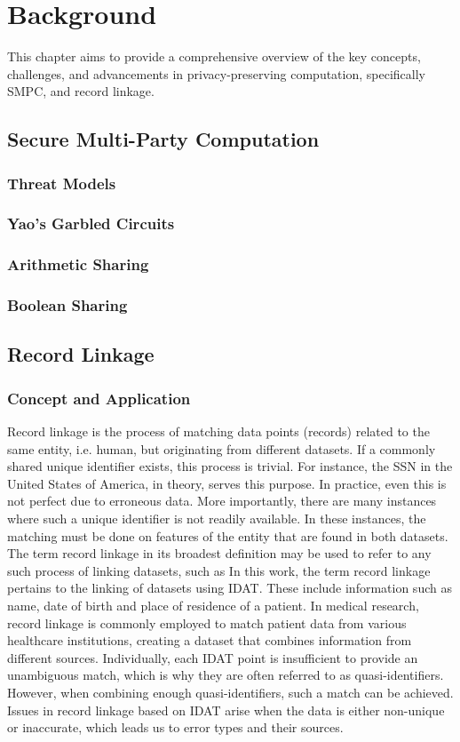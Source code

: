 \chapter{Background}\label{Background}
This chapter aims to provide a comprehensive overview of the key concepts, challenges, and advancements in privacy-preserving computation, specifically \ac{SMPC}, and record linkage.
\section{Secure Multi-Party Computation}

\subsection{Threat Models}
\subsection{Yao's Garbled Circuits}
\subsection{Arithmetic Sharing}
\subsection{Boolean Sharing}
\section{Record Linkage}
\subsection{Concept and Application}
Record linkage is the process of matching data points (records) related to the same entity, i.e. human, but originating from different datasets.
If a commonly shared unique identifier exists, this process is trivial. %
For instance, the \ac{SSN} in the United States of America, in theory, serves this purpose.
In practice, even this is not perfect due to erroneous data.
More importantly, there are many instances where such a unique identifier is not readily available.
In these instances, the matching must be done on features of the entity that are found in both datasets. %
The term record linkage in its broadest definition may be used to refer to any such process of linking datasets, such as %
In this work, the term record linkage pertains to the linking of datasets using \ac{IDAT}.
These include information such as name, date of birth and place of residence of a patient.
In medical research, record linkage is commonly employed to match patient data from various healthcare institutions, creating a dataset that combines information from different sources.
Individually, each \ac{IDAT} point is insufficient to provide an unambiguous match, which is why they are often referred to as quasi-identifiers. %
However, when combining enough quasi-identifiers, such a match can be achieved.
Issues in record linkage based on \ac{IDAT} arise when the data is either non-unique or inaccurate, which leads us to error types and their sources.

